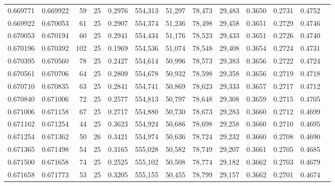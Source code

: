 \begin{tabular}{rrrrrrrrrrrrr}
0.669771 & 0.669922 &    59 &  25 &                                     0.2976 & 554,313 &  51,297 &  78,473 &  29,483 & 0.3650 & 0.2731 & 0.4752 \\
0.669922 & 0.670053 &    61 &  25 &                                     0.2907 & 554,374 &  51,236 &  78,498 &  29,458 & 0.3651 & 0.2729 & 0.4746 \\
0.670053 & 0.670194 &    60 &  25 &                                     0.2941 & 554,434 &  51,176 &  78,523 &  29,433 & 0.3651 & 0.2726 & 0.4740 \\
0.670196 & 0.670392 &   102 &  25 &                                     0.1969 & 554,536 &  51,074 &  78,548 &  29,408 & 0.3654 & 0.2724 & 0.4731 \\
0.670395 & 0.670560 &    78 &  25 &                                     0.2427 & 554,614 &  50,996 &  78,573 &  29,383 & 0.3656 & 0.2722 & 0.4724 \\
0.670561 & 0.670706 &    64 &  25 &                                     0.2809 & 554,678 &  50,932 &  78,598 &  29,358 & 0.3656 & 0.2719 & 0.4718 \\
0.670710 & 0.670835 &    63 &  25 &                                     0.2841 & 554,741 &  50,869 &  78,623 &  29,333 & 0.3657 & 0.2717 & 0.4712 \\
0.670840 & 0.671006 &    72 &  25 &                                     0.2577 & 554,813 &  50,797 &  78,648 &  29,308 & 0.3659 & 0.2715 & 0.4705 \\
0.671006 & 0.671158 &    67 &  25 &                                     0.2717 & 554,880 &  50,730 &  78,673 &  29,283 & 0.3660 & 0.2712 & 0.4699 \\
0.671162 & 0.671254 &    44 &  25 &                                     0.3623 & 554,924 &  50,686 &  78,698 &  29,258 & 0.3660 & 0.2710 & 0.4695 \\
0.671254 & 0.671362 &    50 &  26 &                                     0.3421 & 554,974 &  50,636 &  78,724 &  29,232 & 0.3660 & 0.2708 & 0.4690 \\
0.671365 & 0.671498 &    54 &  25 &                                     0.3165 & 555,028 &  50,582 &  78,749 &  29,207 & 0.3661 & 0.2705 & 0.4685 \\
0.671500 & 0.671658 &    74 &  25 &                                     0.2525 & 555,102 &  50,508 &  78,774 &  29,182 & 0.3662 & 0.2703 & 0.4679 \\
0.671658 & 0.671773 &    53 &  25 &                                     0.3205 & 555,155 &  50,455 &  78,799 &  29,157 & 0.3662 & 0.2701 & 0.4674 \\

\end{tabular}
